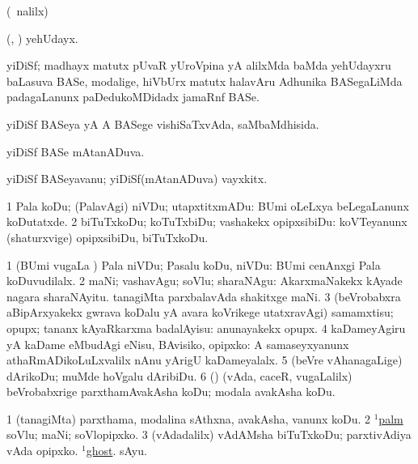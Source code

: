 \bentry
{}
\gl{\saMkiSx} 
\bmng
(\UK\ nalilx) 
\emng
\eentry

\bentry
{} 
\gl{\nA} 
\bmng
(\ashi, \hiV) yehUdayx.
\emng
\eentry

\bentry
{} 
\gl{\nA} 
\bmng
yiDiSf; madhayx matutx  pUvaR yUroVpina yA alilxMda baMda yehUdayxru baLasuva BASe, modalige,  hiVbUrx matutx halavAru Adhunika BASegaLiMda padagaLanunx paDedukoMDidadx jamaRnf BASe.
\emng 
\eentry

\bentry
{} 
\gl{\gu} 
\bmng
yiDiSf BASeya yA A BASege vishiSaTxvAda, saMbaMdhisida.
\emng 
\eentry

\bentry
{} 
\gl{\gu} 
\bmng
yiDiSf BASe mAtanADuva.
\emng
\eentry

\bentry
{} 
\gl{\nA} 
\bmng
yiDiSf BASeyavanu; yiDiSf(mAtanADuva) vayxkitx.
\emng
\eentry

\bentry
{} 
\gl{\sakirx} 
\bmng
\bnum
\num{1} Pala koDu; (PalavAgi) niVDu; utapxtitxmADu:  BUmi oLeLxya beLegaLanunx koDutatxde. 
\num{2} biTuTxkoDu; koTuTxbiDu; vashakekx opipxsibiDu:  koVTeyanunx (shaturxvige) opipxsibiDu, biTuTxkoDu.
\enum
\emng  

\noindent                   
\gl{\akirx} 
\bmng
\bnum
\num{1} (BUmi \mo vugaLa \vi) Pala niVDu; Pasalu koDu, niVDu:  BUmi cenAnxgi Pala koDuvudilalx. 
\num{2} maNi; vashavAgu; soVlu; sharaNAgu:  AkarxmaNakekx kAyade nagara sharaNAyitu.  tanagiMta parxbalavAda shakitxge maNi. 
\num{3} (beVrobabxra aBipArxyakekx gwrava koDalu yA avara koVrikege utatxravAgi) samamxtisu; opupx; tananx kAyaRkarxma badalAyisu:  anunayakekx opupx. 
\num{4} kaDameyAgiru yA kaDame eMbudAgi eNisu, BAvisiko, opipxko:  A samaseyxyanunx athaRmADikoLuLxvalilx nAnu yArigU kaDameyalalx. 
\num{5} (beVre vAhanagaLige) dArikoDu; muMde hoVgalu dAribiDu. 
\num{6} (\ame) (vAda, caceR, \mo vugaLalilx) beVrobabxrige parxthamAvakAsha koDu; modala avakAsha koDu.
\enum
\emng

\noindent
\gl{\pagu} 
\bmng
\bnum
\num{1}  (tanagiMta) parxthama, modalina sAthxna, avakAsha, \mo vanunx koDu. 
\num{2}  \hyperref{kandict_p.pdf}{P}{palm(1) pagu(3)}{$^1$palm} soVlu; maNi; soVlopipxko. 
\num{3}   (vAdadalilx) vAdAMsha biTuTxkoDu; parxtivAdiya vAda opipxko. 
  \hyperref{kandict_g.pdf}{G}{ghost(1) nuga(5)}{$^1$ghost}. 
\banum
{} sAyu.

